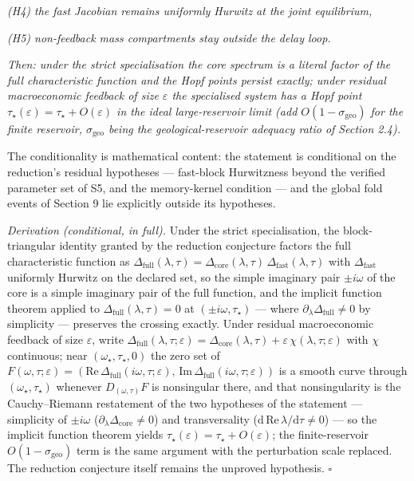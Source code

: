 \documentclass[11pt]{article}
\begin{document}
\emph{(H4) the fast Jacobian remains uniformly Hurwitz at the joint
equilibrium,}

\emph{(H5) non-feedback mass compartments stay outside the delay loop.}

\emph{Then: under the strict specialisation the core spectrum is a
literal factor of the full characteristic function and the Hopf points
persist exactly; under residual macroeconomic feedback of size
\(\varepsilon\) the specialised system has a Hopf point
\(\tau_\star(\varepsilon) = \tau_\star + O(\varepsilon)\) in the ideal
large-reservoir limit (add \(O(1 - \sigma_{\mathrm{geo}})\) for the
finite reservoir, \(\sigma_{\mathrm{geo}}\) being the
geological-reservoir adequacy ratio of Section 2.4).}

The conditionality is mathematical content: the statement is conditional
on the reduction's residual hypotheses --- fast-block Hurwitzness beyond
the verified parameter set of S5, and the memory-kernel condition ---
and the global fold events of Section 9 lie explicitly outside its
hypotheses.

\emph{Derivation (conditional, in full).} Under the strict
specialisation, the block-triangular identity granted by the reduction
conjecture factors the full characteristic function as
\(\Delta_{\mathrm{full}}(\lambda,\tau) = \Delta_{\mathrm{core}}(\lambda,\tau)\,\Delta_{\mathrm{fast}}(\lambda,\tau)\)
with \(\Delta_{\mathrm{fast}}\) uniformly Hurwitz on the declared set,
so the simple imaginary pair \(\pm i\omega\) of the core is a simple
imaginary pair of the full function, and the implicit function theorem
applied to \(\Delta_{\mathrm{full}}(\lambda,\tau) = 0\) at
\((\pm i\omega, \tau_\star)\) --- where
\(\partial_\lambda \Delta_{\mathrm{full}} \ne 0\) by simplicity ---
preserves the crossing exactly. Under residual macroeconomic feedback of
size \(\varepsilon\), write
\(\Delta_{\mathrm{full}}(\lambda,\tau;\varepsilon) = \Delta_{\mathrm{core}}(\lambda,\tau) + \varepsilon\,\chi(\lambda,\tau;\varepsilon)\)
with \(\chi\) continuous; near \((\omega_\star, \tau_\star, 0)\) the
zero set of
\(F(\omega,\tau;\varepsilon) = (\mathrm{Re}\,\Delta_{\mathrm{full}}(i\omega,\tau;\varepsilon),\, \mathrm{Im}\,\Delta_{\mathrm{full}}(i\omega,\tau;\varepsilon))\)
is a smooth curve through \((\omega_\star, \tau_\star)\) whenever
\(D_{(\omega,\tau)}F\) is nonsingular there, and that nonsingularity is
the Cauchy--Riemann restatement of the two hypotheses of the statement
--- simplicity of \(\pm i\omega\)
(\(\partial_\lambda \Delta_{\mathrm{core}} \ne 0\)) and transversality
(\(\mathrm{d}\,\mathrm{Re}\,\lambda/\mathrm{d}\tau \ne 0\)) --- so the
implicit function theorem yields
\(\tau_\star(\varepsilon) = \tau_\star + O(\varepsilon)\); the
finite-reservoir \(O(1-\sigma_{\mathrm{geo}})\) term is the same
argument with the perturbation scale replaced. The reduction conjecture
itself remains the unproved hypothesis. \ensuremath{\square}
\end{document}
